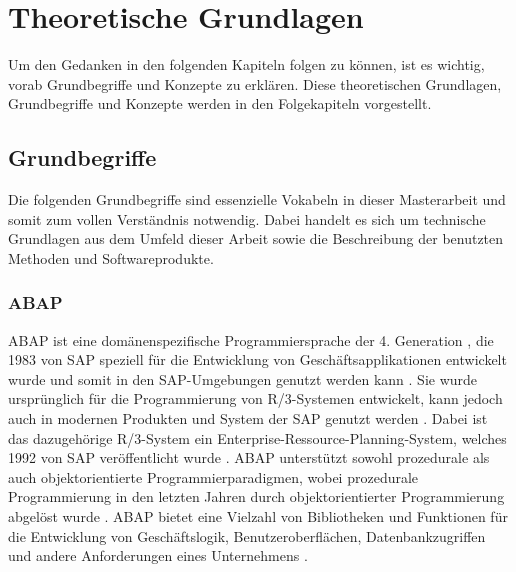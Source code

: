 \chapter{Theoretische Grundlagen}
Um den Gedanken in den folgenden Kapiteln folgen zu können, ist es wichtig, vorab Grundbegriffe und Konzepte zu erklären. Diese theoretischen Grundlagen, Grundbegriffe und Konzepte werden in den Folgekapiteln vorgestellt.

\section{Grundbegriffe}
Die folgenden Grundbegriffe sind essenzielle Vokabeln in dieser Masterarbeit und somit zum vollen Verständnis notwendig. Dabei handelt es sich um technische Grundlagen aus dem Umfeld dieser Arbeit sowie die Beschreibung der benutzten Methoden und Softwareprodukte.

\subsection{ABAP}
\ac{ABAP} ist eine domänenspezifische Programmiersprache der 4. Generation \cite[S. 25]{keller_abap_2006}, die 1983 von SAP speziell für die Entwicklung von Geschäftsapplikationen entwickelt wurde und somit in den SAP-Umgebungen genutzt werden kann \cite[S. 1/2ff]{sap-documentation_abap4_1996}. Sie wurde ursprünglich für die Programmierung von R/3-Systemen entwickelt, kann jedoch auch in modernen Produkten und System der SAP genutzt werden \cite[S. 23ff.]{keller_abap_2006}. Dabei ist das dazugehörige R/3-System ein Enterprise-Ressource-Planning-System, welches 1992 von SAP veröffentlicht wurde \cite[S. 15]{schicht_sap_1999}. ABAP unterstützt sowohl prozedurale als auch objektorientierte Programmierparadigmen, wobei prozedurale Programmierung in den letzten Jahren durch objektorientierter Programmierung abgelöst wurde \cite[S. 136 ff. + 172 ff.]{sap_bc400_2008}. ABAP bietet eine Vielzahl von Bibliotheken und Funktionen für die Entwicklung von Geschäftslogik, Benutzeroberflächen, Datenbankzugriffen und andere Anforderungen eines Unternehmens \cite[S. 24]{keller_abap_2006}.


